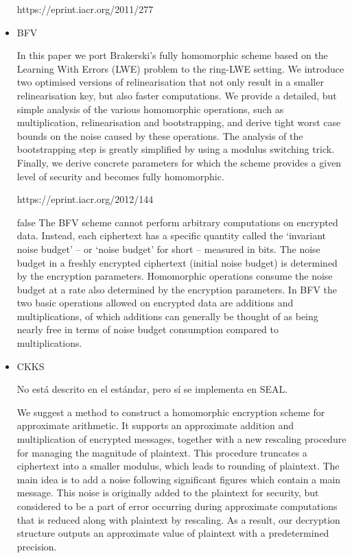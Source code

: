 \begin{itemize}
    https://eprint.iacr.org/2011/277

    \item BFV

    In this paper we port Brakerski's fully homomorphic scheme based on the Learning With Errors (LWE) problem to the ring-LWE setting. We introduce two optimised versions of relinearisation that not only result in a smaller relinearisation key, but also faster computations. We provide a detailed, but simple analysis of the various homomorphic operations, such as multiplication, relinearisation and bootstrapping, and derive tight worst case bounds on the noise caused by these operations. The analysis of the bootstrapping step is greatly simplified by using a modulus switching trick. Finally, we derive concrete parameters for which the scheme provides a given level of security and becomes fully homomorphic.

    https://eprint.iacr.org/2012/144

    \if false
    The BFV scheme cannot perform arbitrary computations on encrypted data.
        Instead, each ciphertext has a specific quantity called the `invariant noise
        budget' -- or `noise budget' for short -- measured in bits. The noise budget
        in a freshly encrypted ciphertext (initial noise budget) is determined by
        the encryption parameters. Homomorphic operations consume the noise budget
        at a rate also determined by the encryption parameters. In BFV the two basic
        operations allowed on encrypted data are additions and multiplications, of
        which additions can generally be thought of as being nearly free in terms of
        noise budget consumption compared to multiplications.
    \fi


    \item CKKS

    No está descrito en el estándar, pero sí se implementa en SEAL.

    We suggest a method to construct a homomorphic encryption scheme for approximate arithmetic. It supports an approximate addition and multiplication of encrypted messages, together with a new rescaling procedure for managing the magnitude of plaintext. This procedure truncates a ciphertext into a smaller modulus, which leads to rounding of plaintext. The main idea is to add a noise following significant figures which contain a main message. This noise is originally added to the plaintext for security, but considered to be a part of error occurring during approximate computations that is reduced along with plaintext by rescaling. As a result, our decryption structure outputs an approximate value of plaintext with a predetermined precision.


\end{itemize}
